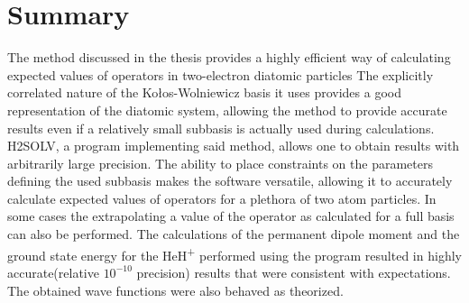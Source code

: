 \documentclass{pracalicmgr}
\begin{document}
\chapter*{Summary}
\label{sec:summary}

The method discussed in the thesis provides a highly efficient way of calculating expected values of operators in two-electron diatomic particles The explicitly correlated nature of the Kołos-Wolniewicz basis it uses provides a good representation of the diatomic system, allowing the method to provide accurate results even if a relatively small subbasis is actually used during calculations. H2SOLV, a program implementing said method, allows one to obtain results with arbitrarily large precision. The ability to place constraints on the parameters defining the used subbasis makes the software versatile, allowing it to accurately calculate expected values of operators for a plethora of two atom particles. In some cases the extrapolating a value of the operator as calculated for a full basis can also be performed. The calculations of the permanent dipole moment and the ground state energy for the HeH\textsuperscript{+} performed using the program resulted in highly accurate(relative $10^{-10}$ precision) results that were consistent with expectations. The obtained wave functions were also behaved as theorized.

\newpage

\end{document}
